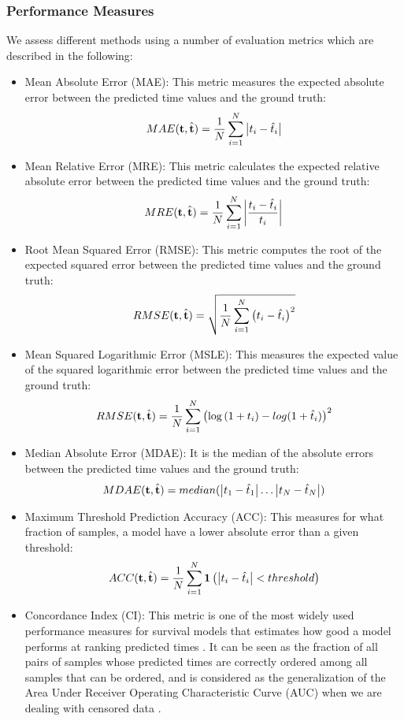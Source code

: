 \subsubsection{Performance Measures}
We assess different methods using a number of evaluation metrics which are described in the following:
\begin{itemize}
\item Mean Absolute Error (MAE): This metric measures the expected absolute error between the predicted time values and the ground truth:
\[MAE(\mathbf{t},\hat{\mathbf{t}}) = \frac{1}{N}\sum_{i=1}^{N}\left|t_i-\hat{t}_i\right|\]
\item Mean Relative Error (MRE): This metric calculates the expected relative absolute error between the predicted time values and the ground truth:
\[MRE(\mathbf{t},\hat{\mathbf{t}}) = \frac{1}{N}\sum_{i=1}^{N}\left|\frac{t_i-\hat{t}_i}{t_i}\right|\]
\item Root Mean Squared Error (RMSE): This metric computes the root of the expected squared error between the predicted time values and the ground truth:
\[RMSE(\mathbf{t},\hat{\mathbf{t}}) = \sqrt{\frac{1}{N}\sum_{i=1}^{N}\left(t_i-\hat{t}_i\right)^2}\]
\item Mean Squared Logarithmic Error (MSLE): This measures the expected value of the squared logarithmic error between the predicted time values and the ground truth:
\[RMSE(\mathbf{t},\hat{\mathbf{t}}) = \frac{1}{N}\sum_{i=1}^{N}\left(\log{(1+t_i)}-log{(1+\hat{t}_i)}\right)^2\]
\item Median Absolute Error (MDAE): It is the median of the absolute errors between the predicted time values and the ground truth:
\[MDAE(\mathbf{t},\hat{\mathbf{t}}) = median(\left|t_1-\hat{t}_1\right|\dots\left|t_N-\hat{t}_N\right|)\]
\item Maximum Threshold Prediction Accuracy (ACC): This measures for what fraction of samples, a model have a lower absolute error than a given threshold:
\[ACC(\mathbf{t},\hat{\mathbf{t}})=\frac{1}{N}\sum_{i=1}^{N}\mathbf{1}\left(\left|t_i-\hat{t}_i\right| < threshold\right)\]
\item Concordance Index (CI): This metric is one of the most widely used performance measures for survival models that estimates how good a model performs at ranking predicted times \cite{harrell1982evaluating}. It can be seen as the fraction of all pairs of samples whose predicted times are correctly ordered among all samples that can be ordered, and is considered as the generalization of the Area Under Receiver Operating Characteristic Curve (AUC) when we are dealing with censored data \cite{steck2008ranking}.
\end{itemize}

